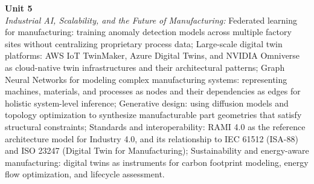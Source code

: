 \noindent\textbf{Unit 5} \\
\textit{Industrial AI, Scalability, and the Future of Manufacturing:} Federated learning for manufacturing: training anomaly detection models across multiple factory sites without centralizing proprietary process data; Large-scale digital twin platforms: AWS IoT TwinMaker, Azure Digital Twins, and NVIDIA Omniverse as cloud-native twin infrastructures and their architectural patterns; Graph Neural Networks for modeling complex manufacturing systems: representing machines, materials, and processes as nodes and their dependencies as edges for holistic system-level inference; Generative design: using diffusion models and topology optimization to synthesize manufacturable part geometries that satisfy structural constraints; Standards and interoperability: RAMI 4.0 as the reference architecture model for Industry 4.0, and its relationship to IEC 61512 (ISA-88) and ISO 23247 (Digital Twin for Manufacturing); Sustainability and energy-aware manufacturing: digital twins as instruments for carbon footprint modeling, energy flow optimization, and lifecycle assessment.

\newpage
{}